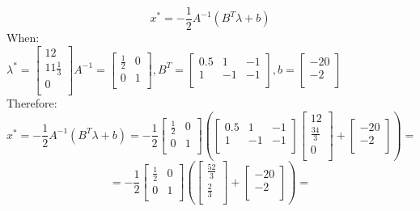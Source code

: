\documentclass[12pt]{article}
\begin{document}
$$ x^* = -\frac{1}{2}A^{-1}(B^T\lambda + b)$$
When:\\
$ \lambda^* = \begin{bmatrix} 
    12 \\
    11\frac{1}{3}\\
    0\\
    \end{bmatrix}
  A^{-1} = \begin{bmatrix}
               \frac{1}{2} & 0 \\
               0 & 1 \\
  \end{bmatrix},
  B^T = \begin{bmatrix}
               0.5 & 1 & -1\\
               1 & -1 & -1\\
  \end{bmatrix},
  b = \begin{bmatrix}   -20 \\ -2\\ \end{bmatrix}$\\
Therefore:\\
$$ x^* = -\frac{1}{2}A^{-1}(B^T\lambda + b)=-\frac{1}{2}
  \begin{bmatrix}
               \frac{1}{2} & 0 \\
               0 & 1 \\
  \end{bmatrix}(
  \begin{bmatrix}
               0.5 & 1 & -1\\
               1 & -1 & -1\\
  \end{bmatrix}
  \begin{bmatrix} 
    12 \\
    \frac{34}{3}\\
    0\\
  \end{bmatrix}
    +
  \begin{bmatrix}   -20 \\ -2\\ \end{bmatrix})    
  =$$
  $$=-\frac{1}{2}
  \begin{bmatrix}
               \frac{1}{2} & 0 \\
               0 & 1 \\
  \end{bmatrix}(\begin{bmatrix} \frac{52}{3} \\ \frac{2}{3}\\ \end{bmatrix} + \begin{bmatrix}   -20 \\ -2\\ \end{bmatrix})=$$
\end{document}
